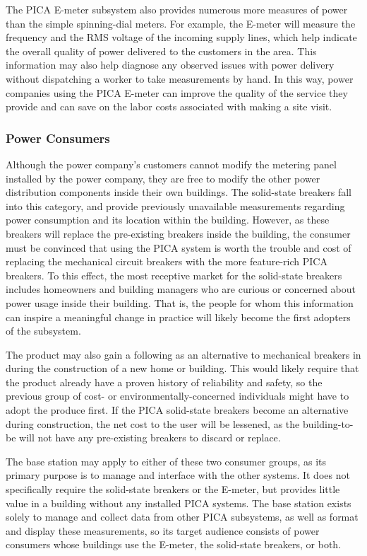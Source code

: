 The PICA E-meter subsystem also provides numerous more measures of power than
the simple spinning-dial meters. For example, the E-meter will measure the
frequency and the RMS voltage of the incoming supply lines, which help indicate
the overall quality of power delivered to the customers in the area. This
information may also help diagnose any observed issues with power delivery
without dispatching a worker to take measurements by hand. In this way, power
companies using the PICA E-meter can improve the quality of the service they
provide and can save on the labor costs associated with making a site visit. 

\subsubsection{Power Consumers}
Although the power company's customers cannot modify the metering panel
installed by the power company, they are free to modify the other power
distribution components inside their own buildings. The solid-state breakers
fall into this category, and provide previously unavailable measurements
regarding power consumption and its location within the building. However, as
these breakers will replace the pre-existing breakers inside the building, the
consumer must be convinced that using the PICA system is worth the trouble and
cost of replacing the mechanical circuit breakers with the more feature-rich
PICA breakers. To this effect, the most receptive market for the solid-state
breakers includes homeowners and building managers who are curious or concerned
about power usage inside their building. That is, the people for whom this
information can inspire a meaningful change in practice will likely become the
first adopters of the subsystem. 

The product may also gain a following as an alternative to mechanical breakers
in during the construction of a new home or building. This would likely require
that the product already have a proven history of reliability and safety, so the
previous group of cost- or environmentally-concerned individuals might have to
adopt the produce first. If the PICA solid-state breakers become an alternative
during construction, the net cost to the user will be lessened, as the
building-to-be will not have any pre-existing breakers to discard or replace. 

The base station may apply to either of these two consumer groups, as its
primary purpose is to manage and interface with the other systems. It does not
specifically require the solid-state breakers or the E-meter, but provides
little value in a building without any installed PICA systems. The base station
exists solely to manage and collect data from other PICA subsystems, as well as
format and display these measurements, so its target audience consists of power
consumers whose buildings use the E-meter, the solid-state breakers, or both.
 
